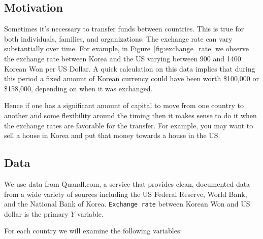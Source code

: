 \documentclass[12pt]{article}
\begin{document}
\subsection{Motivation}

Sometimes it's necessary to transfer funds between countries. This is true
for both individuals, families, and organizations. The exchange rate can
vary substantially over time. For example, in
Figure~\ref{fig:exchange_rate} we observe the exchange rate between Korea
and the US varying between 900 and 1400 Korean Won per US Dollar. A quick
calculation on this data 
implies that during this period a fixed amount of Korean currency 
could have been worth \$100,000 or \$158,000, depending on when it was  
exchanged. 

Hence if one has a significant amount of capital to move from
one country to another and some flexibility around the timing then it makes
sense to do it when the exchange rates
are favorable for the transfer. For example, you may want to sell a
house in Korea and put that money towards a house in the US.

\subsection{Data}

We use data from Quandl.com, a service that provides clean, documented
data from a wide variety of sources including the US Federal Reserve,
World Bank, and the National Bank of Korea. 
{\tt Exchange rate} between Korean Won and US dollar is the primary $Y$
variable.

For each country we will examine the following variables:
\end{document}
